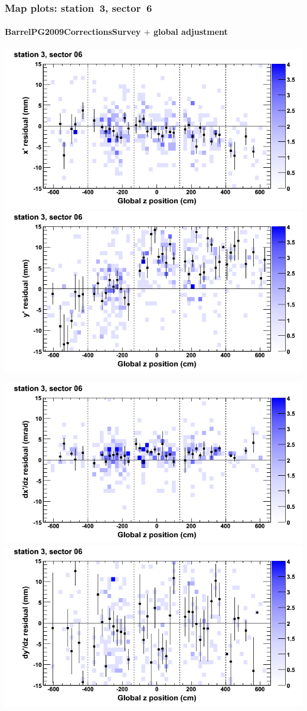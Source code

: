 \documentclass[compress]{beamer}
\begin{document}
\begin{frame}
\frametitle{Map plots: station~3, sector~6}
\framesubtitle{BarrelPG2009CorrectionsSurvey $+$ global adjustment}
\includegraphics[width=0.5\linewidth]{mapplots_re01/DTvsz_st3sec06_x.png}
\includegraphics[width=0.5\linewidth]{mapplots_re01/DTvsz_st3sec06_y.png}

\includegraphics[width=0.5\linewidth]{mapplots_re01/DTvsz_st3sec06_dxdz.png}
\includegraphics[width=0.5\linewidth]{mapplots_re01/DTvsz_st3sec06_dydz.png}
\end{frame}
\end{document}
